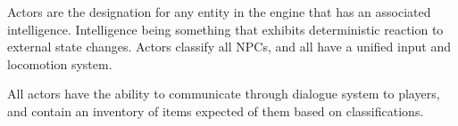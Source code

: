 Actors are the designation for any entity in the engine that has an associated intelligence. Intelligence being something that exhibits deterministic reaction to external state changes. Actors classify all NPCs, and all have a unified input and locomotion system.

All actors have the ability to communicate through dialogue system to players, and contain an inventory of items expected of them based on classifications.